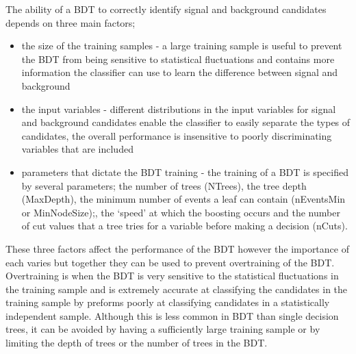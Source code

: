 The ability of a BDT to correctly identify signal and background candidates depends on three main factors;
\begin{itemize}
\item the size of the training samples - a large training sample is useful to prevent the BDT from being sensitive to statistical fluctuations and contains more information the classifier can use to learn the difference between signal and background
\item the input variables - different distributions in the input variables for signal and background candidates enable the classifier to easily separate the types of candidates, the overall performance is insensitive to poorly discriminating variables that are included
\item parameters that dictate the BDT training - the training of a BDT is specified by several parameters; the number of trees (NTrees), the tree depth (MaxDepth), the minimum number of events a leaf can contain (nEventsMin or MinNodeSize);, the `speed’ at which the boosting occurs and the number of cut values that a tree tries for a variable before making a decision (nCuts).
\end{itemize}

These three factors affect the performance of the BDT however the importance of each varies but together they can be used to prevent overtraining of the BDT. Overtraining is when the BDT is very sensitive to the statistical fluctuations in the training sample and is extremely accurate at classifying the candidates in the training sample by preforms poorly at classifying candidates in a statistically independent sample. Although this is less common in BDT than single decision trees, it can be avoided by having a sufficiently large training sample or by limiting the depth of trees or the number of trees in the BDT. 






